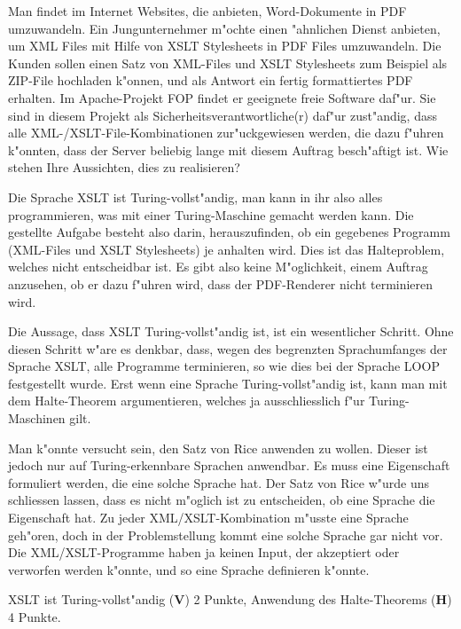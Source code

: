 Man findet im Internet Websites, die anbieten, Word-Dokumente in PDF
umzuwandeln.
Ein Jungunternehmer m"ochte einen "ahnlichen Dienst anbieten, um XML Files
mit Hilfe von XSLT Stylesheets in PDF Files umzuwandeln.
Die Kunden sollen einen Satz von XML-Files und XSLT Stylesheets zum
Beispiel als ZIP-File hochladen k"onnen, und als Antwort ein fertig
formattiertes PDF erhalten.
Im Apache-Projekt FOP findet er geeignete freie Software daf"ur.
Sie sind in diesem Projekt als Sicherheitsverantwortliche(r) daf"ur zust"andig,
dass alle XML-/XSLT-File-Kombinationen zur"uckgewiesen werden, die dazu f"uhren
k"onnten, dass der Server beliebig lange mit diesem Auftrag besch"aftigt ist.
Wie stehen Ihre Aussichten, dies zu realisieren?

\begin{loesung}
Die Sprache XSLT ist Turing-vollst"andig, man kann in ihr also alles
programmieren, was mit einer Turing-Maschine gemacht werden kann.
Die gestellte Aufgabe besteht also darin, herauszufinden, ob ein
gegebenes Programm (XML-Files und XSLT Stylesheets) je anhalten wird.
Dies ist das Halteproblem, welches nicht entscheidbar ist.
Es gibt also keine M"oglichkeit, einem Auftrag anzusehen, ob er dazu
f"uhren wird, dass der PDF-Renderer nicht terminieren wird.
\end{loesung}

\begin{diskussion}
Die Aussage, dass XSLT Turing-vollst"andig ist, ist ein wesentlicher Schritt.
Ohne diesen Schritt w"are es denkbar, dass, wegen des begrenzten Sprachumfanges
der Sprache XSLT, alle Programme terminieren, so wie dies bei der Sprache LOOP
festgestellt wurde.
Erst wenn eine Sprache Turing-vollst"andig ist, kann man mit dem Halte-Theorem
argumentieren, welches ja ausschliesslich f"ur Turing-Maschinen gilt.

Man k"onnte versucht sein, den Satz von Rice anwenden zu wollen.
Dieser ist jedoch nur auf Turing-erkennbare Sprachen anwendbar.
Es muss eine Eigenschaft formuliert werden, die eine solche Sprache hat. 
Der Satz von Rice w"urde uns schliessen lassen, dass es nicht m"oglich ist
zu entscheiden, ob eine Sprache die Eigenschaft hat.
Zu jeder XML/XSLT-Kombination m"usste eine Sprache geh"oren, doch
in der Problemstellung kommt eine solche Sprache gar nicht vor.
Die XML/XSLT-Programme haben ja keinen Input, der akzeptiert oder
verworfen werden k"onnte, und so eine Sprache definieren k"onnte.
\end{diskussion}

\begin{bewertung}
XSLT ist Turing-vollst"andig ({\bf V}) 2 Punkte,
Anwendung des Halte-Theorems ({\bf H}) 4 Punkte.
\end{bewertung}
